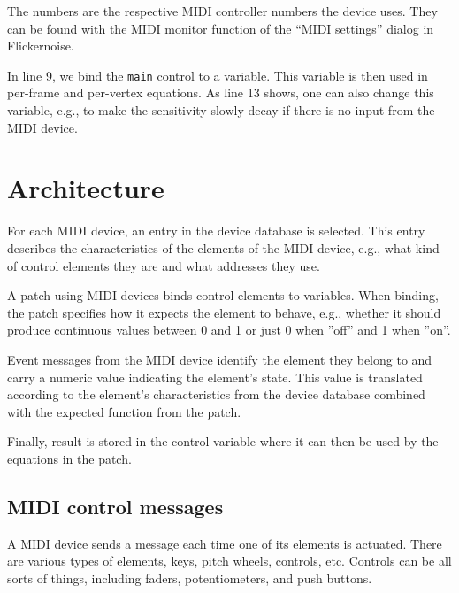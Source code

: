 \documentclass[11pt,a4paper]{article}
\begin{document}
The numbers are the respective MIDI controller numbers the device uses.
They can be found with the MIDI monitor function of the ``MIDI settings''
dialog in Flickernoise.

In line 9, we bind the {\tt main} control to a variable. This variable is
then used in per-frame and per-vertex equations. As line 13 shows, one
can also change this variable, e.g., to make the sensitivity slowly decay
if there is no input from the MIDI device.




\figarch


\section{Architecture}

For each MIDI device, an entry in the device database is selected.
This entry describes the characteristics of the elements of the MIDI
device, e.g., what kind of control elements they are and what
addresses they use.

A patch using MIDI devices binds control elements to variables.
When binding, the patch specifies how it expects the element to
behave, e.g., whether it should produce continuous values between
0 and 1 or just 0 when ''off'' and 1 when ''on''.

Event messages from the MIDI device identify the element they
belong to and carry a numeric value indicating the element's state.
This value is translated according to the element's characteristics
from the device database combined with the expected function from
the patch.

Finally, result is stored in the control variable where it can
then be used by the equations in the patch.




\figmsg


\subsection{MIDI control messages}

A MIDI device sends a message each time one of its elements is actuated.
There are various types of elements, keys, pitch wheels, controls, etc.
Controls can be all sorts of things, including faders, potentiometers,
and push buttons.
\end{document}
